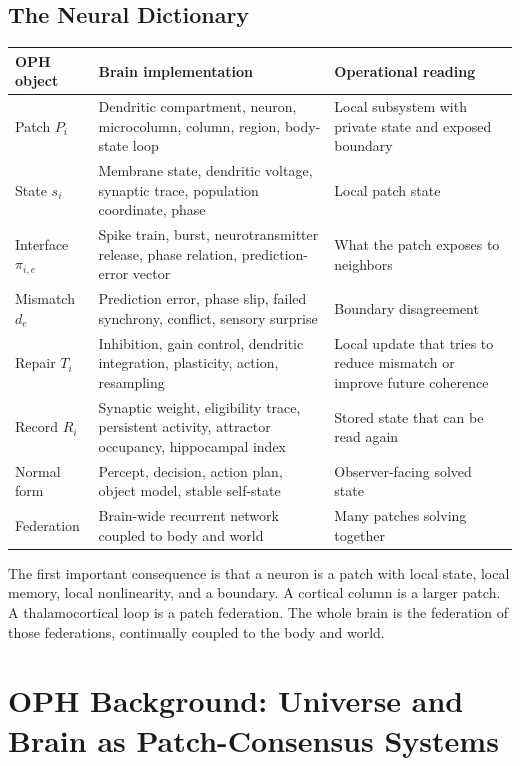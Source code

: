 \documentclass[11pt]{article}
\theoremstyle{remark}
\theoremstyle{plain}
\begin{document}
\subsection{The Neural Dictionary}

\begin{longtable}{L{0.22\textwidth}L{0.34\textwidth}L{0.34\textwidth}}
\toprule
\textbf{OPH object} & \textbf{Brain implementation} & \textbf{Operational reading} \\
\midrule
\endhead
Patch \(P_i\) & Dendritic compartment, neuron, microcolumn, column, region, body-state loop & Local subsystem with private state and exposed boundary \\
State \(s_i\) & Membrane state, dendritic voltage, synaptic trace, population coordinate, phase & Local patch state \\
Interface \(\pi_{i,e}\) & Spike train, burst, neurotransmitter release, phase relation, prediction-error vector & What the patch exposes to neighbors \\
Mismatch \(d_e\) & Prediction error, phase slip, failed synchrony, conflict, sensory surprise & Boundary disagreement \\
Repair \(T_i\) & Inhibition, gain control, dendritic integration, plasticity, action, resampling & Local update that tries to reduce mismatch or improve future coherence \\
Record \(R_i\) & Synaptic weight, eligibility trace, persistent activity, attractor occupancy, hippocampal index & Stored state that can be read again \\
Normal form & Percept, decision, action plan, object model, stable self-state & Observer-facing solved state \\
Federation & Brain-wide recurrent network coupled to body and world & Many patches solving together \\
\bottomrule
\end{longtable}

The first important consequence is that a neuron is a patch with local state, local memory, local nonlinearity, and a boundary. A cortical column is a larger patch. A thalamocortical loop is a patch federation. The whole brain is the federation of those federations, continually coupled to the body and world.

\section{OPH Background: Universe and Brain as Patch-Consensus Systems}
\end{document}
